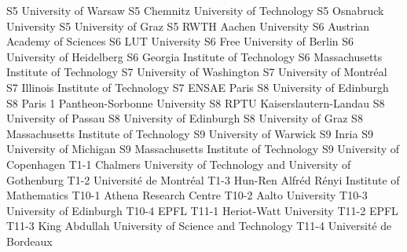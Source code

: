 \begin{multicols}{2}
{S5}
{}
{University of Warsaw}
{S5}
{}
{Chemnitz University of Technology}
{S5}
{}
{Osnabruck University}
{S5}
{}
{University of Graz}
{S5}
{}
{RWTH Aachen University}
{S6}
{}
{Austrian Academy of Sciences}
{S6}
{}
{LUT University}
{S6}
{}
{Free University of Berlin}
{S6}
{}
{University of Heidelberg}
{S6}
{}
{Georgia Institute of Technology}
{S6}
{}
{Massachusetts Institute of Technology}
{S7}
{}
{University of Washington}
{S7}
{}
{University of Montréal}
{S7}
{}
{Illinois Institute of Technology}
{S7}
{}
{ENSAE Paris}
{S8}
{}
{University of Edinburgh}
{S8}
{}
{Paris 1 Pantheon-Sorbonne University}
{S8}
{}
{RPTU Kaiserslautern-Landau}
{S8}
{}
{University of Passau}
{S8}
{}
{University of Edinburgh}
{S8}
{}
{University of Graz}
{S8}
{}
{Massachusetts Institute of Technology}
{S9}
{}
{University of Warwick}
{S9}
{}
{Inria}
{S9}
{}
{University of Michigan}
{S9}
{}
{Massachusetts Institute of Technology}
{S9}
{}
{University of Copenhagen}
{T1-1}
{}
{Chalmers University of Technology and University of Gothenburg}
{T1-2}
{}
{Université de Montréal}
{T1-3}
{}
{Hun-Ren Alfréd Rényi Institute of Mathematics}
{T10-1}
{}
{Athena Research Centre}
{T10-2}
{}
{Aalto University}
{T10-3}
{}
{University of Edinburgh}
{T10-4}
{}
{EPFL}
{T11-1}
{}
{Heriot-Watt University}
{T11-2}
{}
{EPFL}
{T11-3}
{}
{King Abdullah University of Science and Technology}
{T11-4}
{}
{Université de Bordeaux}

\end{multicols}
